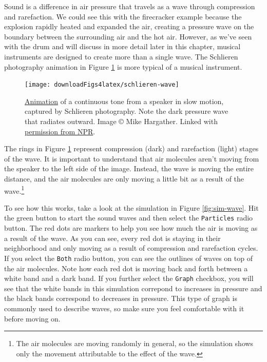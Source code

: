 \documentclass[
]{book}
\begin{document}
Sound is a difference in air pressure that travels as a wave through compression and rarefaction.
We could see this with the firecracker example because the explosion rapidly heated and expanded the air, creating a pressure wave on the boundary between the surrounding air and the hot air.
However, as we've seen with the drum and will discuss in more detail later in this chapter, musical instruments are designed to create more than a single wave.
The Schlieren photography animation in Figure \ref{fig:schlieren-wave} is more typical of a musical instrument.



\begin{figure}
\texttt{[image: downloadFigs4latex/schlieren-wave]} \caption{\href{http://media.npr.org/assets/img/2014/01/21/speaker1.gif}{Animation} of a continuous tone from a speaker in slow motion, captured by Schlieren photography. Note the dark pressure wave that radiates outward. Image © Mike Hargather. Linked with \href{https://www.npr.org/about-npr/179876898/terms-of-use\#LinksNPRServices}{permission from NPR}.}\label{fig:schlieren-wave}
\end{figure}

The rings in Figure \ref{fig:schlieren-wave} represent compression (dark) and rarefaction (light) stages of the wave.
It is important to understand that air molecules aren't moving from the speaker to the left side of the image.
Instead, the wave is moving the entire distance, and the air molecules are only moving a little bit as a result of the wave.\footnote{The air molecules are moving randomly in general, so the simulation shows only the movement attributable to the effect of the wave.}

To see how this works, take a look at the simulation in Figure \ref{fig:sim-wave}.
Hit the green button to start the sound waves and then select the \texttt{Particles} radio button.
The red dots are markers to help you see how much the air is moving as a result of the wave.
As you can see, every red dot is staying in their neighborhood and only moving as a result of compression and rarefaction cycles.
If you select the \texttt{Both} radio button, you can see the outlines of waves on top of the air molecules.
Note how each red dot is moving back and forth between a white band and a dark band.
If you further select the \texttt{Graph} checkbox, you will see that the white bands in this simulation correpond to increases in pressure and the black bands correspond to decreases in pressure.
This type of graph is commonly used to describe waves, so make sure you feel comfortable with it before moving on.
\end{document}
